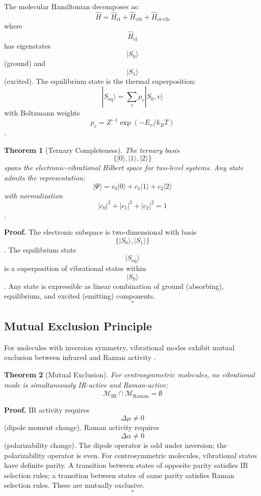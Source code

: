 \documentclass[twocolumn,10pt]{article}
\newtheorem{theorem}{Theorem}[section]
\begin{document}
The molecular Hamiltonian decomposes as:
\begin{equation}
\hat{H} = \hat{H}_{\text{el}} + \hat{H}_{\text{vib}} + \hat{H}_{\text{el-vib}}
\end{equation}
where $$\hat{H}_{\text{el}}$$ has eigenstates $$|S_0\rangle$$ (ground) and $$|S_1\rangle$$ (excited). The equilibrium state is the thermal superposition:
\begin{equation}
|S_{\text{eq}}\rangle = \sum_v p_v |S_0, v\rangle
\end{equation}
with Boltzmann weights $$p_v = Z^{-1} \exp(-E_v / k_B T)$$.

\begin{theorem}[Ternary Completeness]
The ternary basis $$\{|0\rangle, |1\rangle, |2\rangle\}$$ spans the electronic-vibrational Hilbert space for two-level systems. Any state admits the representation:
\begin{equation}
|\Psi\rangle = c_0 |0\rangle + c_1 |1\rangle + c_2 |2\rangle
\end{equation}
with normalization $$|c_0|^2 + |c_1|^2 + |c_2|^2 = 1$$.
\end{theorem}

\textbf{Proof.} The electronic subspace is two-dimensional with basis $$\{|S_0\rangle, |S_1\rangle\}$$. The equilibrium state $$|S_{\text{eq}}\rangle$$ is a superposition of vibrational states within $$|S_0\rangle$$. Any state is expressible as linear combination of ground (absorbing), equilibrium, and excited (emitting) components. \hfill $$\square$$

\subsection{Mutual Exclusion Principle}

For molecules with inversion symmetry, vibrational modes exhibit mutual exclusion between infrared and Raman activity \cite{Herzberg1945}.

\begin{theorem}[Mutual Exclusion]
For centrosymmetric molecules, no vibrational mode is simultaneously IR-active and Raman-active:
\begin{equation}
\mathcal{M}_{\text{IR}} \cap \mathcal{M}_{\text{Raman}} = \emptyset
\end{equation}
\end{theorem}

\textbf{Proof.} IR activity requires $$\Delta\mu \neq 0$$ (dipole moment change). Raman activity requires $$\Delta\alpha \neq 0$$ (polarizability change). The dipole operator is odd under inversion; the polarizability operator is even. For centrosymmetric molecules, vibrational states have definite parity. A transition between states of opposite parity satisfies IR selection rules; a transition between states of same parity satisfies Raman selection rules. These are mutually exclusive. \hfill $$\square$$
\end{document}
